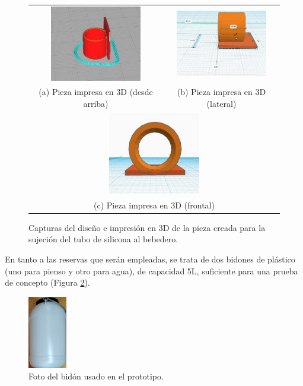 \documentclass[12pt]{article}
\begin{document}
	\begin{figure}[h]
		\begin{center}
			\begin{tabular}{cc}
				\includegraphics[width=40mm]{img/pieza_sujecion_1.jpg} &   \includegraphics[width=40mm]{img/pieza_sujecion_2.jpg} \\
				(a) Pieza impresa en 3D (desde arriba) & (b) Pieza impresa en 3D (lateral) \\[6pt]
				\multicolumn{2}{c}{\includegraphics[width=40mm]{img/pieza_sujecion_3.jpg} }\\
				\multicolumn{2}{c}{(c) Pieza impresa en 3D (frontal) }
			\end{tabular}
			\caption{Capturas del diseño e impresión en 3D de la pieza creada para la sujeción del tubo de silicona al bebedero. }
			\label{fig: pieza 3D sujecion bebedero}
		\end{center}
	\end{figure}
	
	\noindent En tanto a las reservas que serán empleadas, se trata de dos bidones de plástico (uno para pienso y otro para agua), de capacidad 5L, suficiente para una prueba de concepto (Figura \ref{Captura bidon}). \\
	
	
	\begin{figure}[h!]
		\begin{center}
			\includegraphics[width=0.15\textwidth]{img/bidon.png}
			\caption{Foto del bidón usado en el prototipo.}
			\label{Captura bidon}
		\end{center}
	\end{figure}
	
\end{document}
